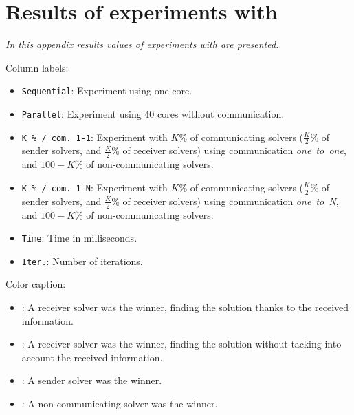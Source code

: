 \chapter{Results of experiments with \nqp}
\label{app:nqp}
\textit{In this appendix results values of experiments with \nqp{} are presented.}
\vfill
\newpage

Column labels:
\begin{itemize}
\item \texttt{Sequential}: Experiment using one core.
\item \texttt{Parallel}: Experiment using 40 cores without communication.
\item \texttt{K \% / com. 1-1}: Experiment with $K$\% of communicating solvers ($\tfrac{K}{2}$\% of sender solvers, and $\tfrac{K}{2}$\% of receiver solvers) using communication \textit{one~to~one}, and $100-K$\% of non-communicating solvers.
\item \texttt{K \% / com. 1-N}: Experiment with $K$\% of communicating solvers ($\tfrac{K}{2}$\% of sender solvers, and $\tfrac{K}{2}$\% of receiver solvers) using communication \textit{one~to~N}, and $100-K$\% of non-communicating solvers.
\item \texttt{Time}: Time in milliseconds. 
\item \texttt{Iter.}: Number of iterations.
\end{itemize}

Color caption:
\begin{itemize}
\item {}: A receiver solver was the winner, finding the solution thanks to the received information.
\item {}: A receiver solver was the winner, finding the solution without tacking into account the received information.
\item {}: A sender solver was the winner.
\item {}: A non-communicating solver was the winner.
\end{itemize}


\clearpage
